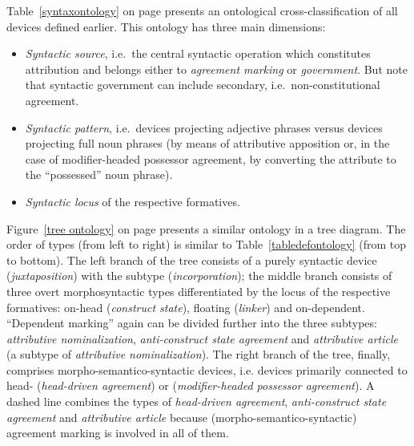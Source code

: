 Table~\ref{syntaxontology} on page \pageref{syntaxontology} presents an ontological cross-classification of all devices defined earlier. This ontology has three main dimensions: 
\begin{itemize}
\item\textit{Syntactic source}, i.e.~the central syntactic operation which constitutes attribution and belongs either to \textit{agreement marking} or \textit{government}. But note that syntactic government can include secondary, i.e.~non-constitutional agreement.
\item\textit{Syntactic pattern}, i.e.~devices projecting adjective phrases versus devices projecting full noun phrases (by means of attributive apposition or, in the case of modifier\hyp{}headed possessor agreement, by converting the attribute to the “possessed” noun phrase).
\item\textit{Syntactic locus} of the respective formatives.
\end{itemize}
Figure~\ref{tree ontology} on page \pageref{tree ontology} presents a similar ontology in a tree diagram. The order of types (from left to right) is similar to Table~\ref{tabledefontology} (from top to bottom). The left branch of the tree consists of a purely syntactic device (\textit{juxtaposition}) with the subtype (\textit{incorporation}); the middle branch consists of three overt morphosyntactic types differentiated by the locus of the respective formatives: on-head (\textit{construct state}), floating (\textit{linker}) and on-dependent. “Dependent marking” again can be divided further into the three subtypes: \textit{attributive nominalization}, \textit{anti\hyp{}construct state agreement} and \textit{attributive article} (a subtype of \textit{attributive nominalization}). The right branch of the tree, finally, comprises morpho-semantico-syntactic devices, i.e. devices primarily connected to head- (\textit{head\hyp{}driven agreement}) or  (\textit{modifier\hyp{}headed possessor agreement}). A dashed line combines the types of \textit{head\hyp{}driven agreement}, \textit{anti\hyp{}construct state agreement} and \textit{attributive article} because (morpho-semantico-syntactic) agreement marking is involved in all of them.
